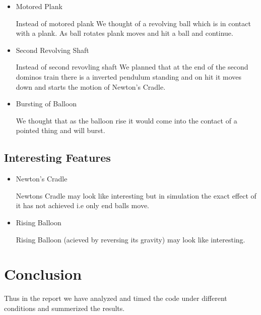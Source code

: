 \documentclass[a4paper,11pt]{article}
\begin{document}
\begin{itemize}
\item {Motored Plank}
\begin{description} Instead of motored plank We thought of a revolving ball which is in contact with a plank. As ball rotates plank moves and hit a ball and continue.
\end{description}

\item {Second Revolving Shaft}
\begin{description} Instead of second revovling shaft We planned that at the end of the second dominos train there is a inverted pendulum standing and on hit it moves down and starts the motion of Newton's Cradle.
\end{description}

\item{Bursting of Balloon}
\begin{description} We thought that as the balloon rise it would come into the contact of a pointed thing and will burst.
\end{description}
\end{itemize}

\subsection{Interesting Features}
\begin{itemize}
\item {Newton's Cradle}
\begin{description} Newtons Cradle may look like interesting but in simulation the exact effect of it has not achieved i.e only end balls move.
\end{description}

\item {Rising Balloon}
\begin{description} Rising Balloon (acieved by reversing its gravity) may look like interesting.
\end{description}
\end{itemize}

\section{Conclusion}
Thus in the report we have analyzed and timed the code under different conditions and summerized the results.
\end{document}
